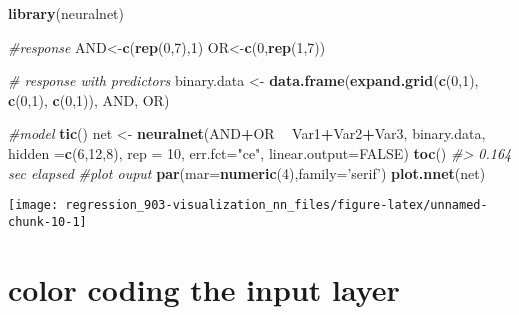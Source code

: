 \documentclass[]{book}
\newenvironment{Shaded}{\begin{snugshade}}{\end{snugshade}}
\newcommand{\CommentTok}[1]{\textcolor[rgb]{0.56,0.35,0.01}{\textit{#1}}}
\newcommand{\DataTypeTok}[1]{\textcolor[rgb]{0.13,0.29,0.53}{#1}}
\newcommand{\DecValTok}[1]{\textcolor[rgb]{0.00,0.00,0.81}{#1}}
\newcommand{\KeywordTok}[1]{\textcolor[rgb]{0.13,0.29,0.53}{\textbf{#1}}}
\newcommand{\NormalTok}[1]{#1}
\newcommand{\OperatorTok}[1]{\textcolor[rgb]{0.81,0.36,0.00}{\textbf{#1}}}
\newcommand{\OtherTok}[1]{\textcolor[rgb]{0.56,0.35,0.01}{#1}}
\newcommand{\StringTok}[1]{\textcolor[rgb]{0.31,0.60,0.02}{#1}}
\begin{document}
\begin{Shaded}
\begin{Highlighting}[]
\KeywordTok{library}\NormalTok{(neuralnet)}
 
\CommentTok{#response}
\NormalTok{AND<-}\KeywordTok{c}\NormalTok{(}\KeywordTok{rep}\NormalTok{(}\DecValTok{0}\NormalTok{,}\DecValTok{7}\NormalTok{),}\DecValTok{1}\NormalTok{)}
\NormalTok{OR<-}\KeywordTok{c}\NormalTok{(}\DecValTok{0}\NormalTok{,}\KeywordTok{rep}\NormalTok{(}\DecValTok{1}\NormalTok{,}\DecValTok{7}\NormalTok{))}
 
\CommentTok{# response with predictors}
\NormalTok{binary.data <-}\StringTok{ }\KeywordTok{data.frame}\NormalTok{(}\KeywordTok{expand.grid}\NormalTok{(}\KeywordTok{c}\NormalTok{(}\DecValTok{0}\NormalTok{,}\DecValTok{1}\NormalTok{), }\KeywordTok{c}\NormalTok{(}\DecValTok{0}\NormalTok{,}\DecValTok{1}\NormalTok{), }\KeywordTok{c}\NormalTok{(}\DecValTok{0}\NormalTok{,}\DecValTok{1}\NormalTok{)), AND, OR)}
 
\CommentTok{#model}
\KeywordTok{tic}\NormalTok{()}
\NormalTok{net <-}\StringTok{ }\KeywordTok{neuralnet}\NormalTok{(AND}\OperatorTok{+}\NormalTok{OR }\OperatorTok{~}\StringTok{ }\NormalTok{Var1}\OperatorTok{+}\NormalTok{Var2}\OperatorTok{+}\NormalTok{Var3,}
\NormalTok{                 binary.data, }\DataTypeTok{hidden =}\KeywordTok{c}\NormalTok{(}\DecValTok{6}\NormalTok{,}\DecValTok{12}\NormalTok{,}\DecValTok{8}\NormalTok{), }
                 \DataTypeTok{rep =} \DecValTok{10}\NormalTok{, }
                 \DataTypeTok{err.fct=}\StringTok{"ce"}\NormalTok{, }
                 \DataTypeTok{linear.output=}\OtherTok{FALSE}\NormalTok{)}
\KeywordTok{toc}\NormalTok{()}
\CommentTok{#> 0.164 sec elapsed}
\CommentTok{#plot ouput}
\KeywordTok{par}\NormalTok{(}\DataTypeTok{mar=}\KeywordTok{numeric}\NormalTok{(}\DecValTok{4}\NormalTok{),}\DataTypeTok{family=}\StringTok{'serif'}\NormalTok{)}
\KeywordTok{plot.nnet}\NormalTok{(net)}
\end{Highlighting}
\end{Shaded}

\begin{center}\texttt{[image: regression\_903-visualization\_nn\_files/figure-latex/unnamed-chunk-10-1]} \end{center}

\hypertarget{color-coding-the-input-layer}{%
\section{color coding the input layer}\label{color-coding-the-input-layer}}
\end{document}
